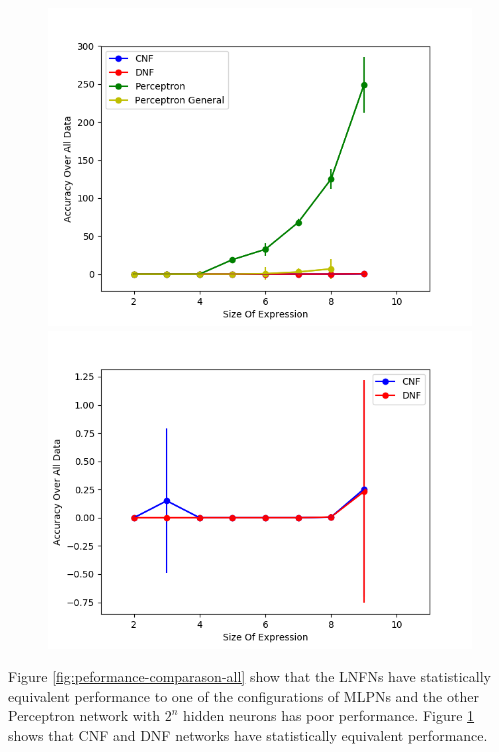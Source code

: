 \begin{figure}[H]
  \centering
  \begin{minipage}[b]{0.45\textwidth}
    \includegraphics[width=\textwidth]{All-Peformance-Comparason.png}
    \caption{}
    \label{fig:peformance-comparason-all}
  \end{minipage}
  \begin{minipage}[b]{0.45\textwidth}
    \includegraphics[width=\textwidth]{CNFvsDNF.png}
    \caption{}
    \label{fig:peformance-comparason-cnfdnf}
  \end{minipage}
  \hfill
\end{figure}

Figure \ref{fig:peformance-comparason-all} show that the LNFNs have statistically equivalent performance to one of the configurations of MLPNs and the other Perceptron network with $2^n$ hidden neurons has poor performance. Figure \ref{fig:peformance-comparason-cnfdnf} shows that CNF and DNF networks have statistically equivalent performance. 

